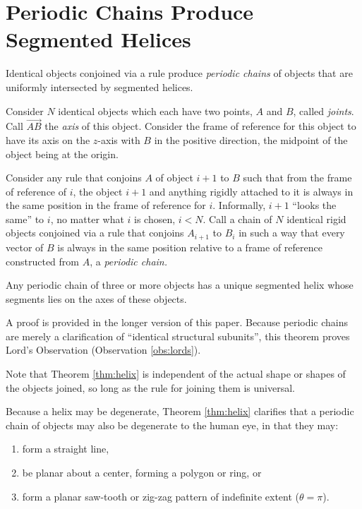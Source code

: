 \documentclass{svproc}
\begin{document}
\label{sec:SegmentedHelix}

\section{Periodic Chains Produce Segmented Helices}

Identical objects conjoined via a rule
produce {\em periodic chains} of objects that are uniformly intersected
by segmented helices.

Consider $N$ identical objects which each have two points, $A$ and $B$, called {\em joints}. Call
$\overrightarrow{AB}$ the {\em axis} of this object.
Consider the frame of reference for this object to have
its axis on the $z$-axis with $B$ in the positive direction, the
midpoint of the object being at the origin.

Consider any rule that conjoins $A$ of object $i+1$ to $B$ such that
from the frame of reference of $i$, the object $i+1$ and anything rigidly
attached to it is always in the same position in the frame of reference for $i$.
Informally, $i+1$ ``looks the same'' to $i$, no matter what $i$ is chosen, $i < N$.
Call a chain of $N$ identical rigid objects conjoined via a rule that
conjoins $A_{i+1}$ to $B_i$ in such a way that every vector
of $B$ is always in the same position relative to a frame of reference
constructed from $A$, a {\em periodic chain.}

\begin{theorem}
  \label{thm:helix}
  Any periodic chain of three or more objects has a unique segmented helix
  whose segments
  lies on the axes of these objects.
\end{theorem}

A proof is provided in the longer version of this paper\cite{readfullsegmentedhelix}.
Because periodic chains are merely a clarification of ``identical structural subunits'',
this theorem proves Lord's Observation (Observation \ref{obs:lords}).

Note that Theorem \ref{thm:helix} is independent of the actual
shape or shapes of the objects joined, so long as the rule for joining them
is universal.

Because a helix may be degenerate, Theorem \ref{thm:helix} clarifies that
a periodic chain of objects may also be degenerate to the human eye, in that they may:
\begin{enumerate}
\item form a straight line,
\item be planar about a center, forming a polygon or ring, or
\item form a planar saw-tooth or zig-zag pattern of indefinite extent ($\theta = \pi$).
\end{enumerate}
\end{document}
